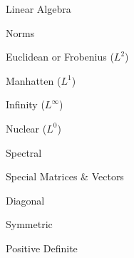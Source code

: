 \documentclass[11pt]{article}
\begin{document}
\begin{enumerate}
\begin{item}
      Linear Algebra

      \begin{enumerate}

          \begin{item}

            Norms

            \begin{enumerate}

                \begin{item}
                  Euclidean or Frobenius ($L^2$)
                \end{item}

                \begin{item}
                  Manhatten ($L^1$)
                \end{item}

                \begin{item}
                  Infinity ($L^{\infty}$)
                \end{item}

                \begin{item}
                  Nuclear ($L^0$)
                \end{item}

                \begin{item}
                  Spectral
                \end{item}

            \end{enumerate}

          \end{item}

          \begin{item}

            Special Matrices \& Vectors

            \begin{enumerate}

                \begin{item}
                  Diagonal
                \end{item}

                \begin{item}
                  Symmetric
                \end{item}

                \begin{item}
                  Positive Definite 
                \end{item}


\end{enumerate}
\end{item}
\end{enumerate}
\end{item}
\end{enumerate}
\end{document}
